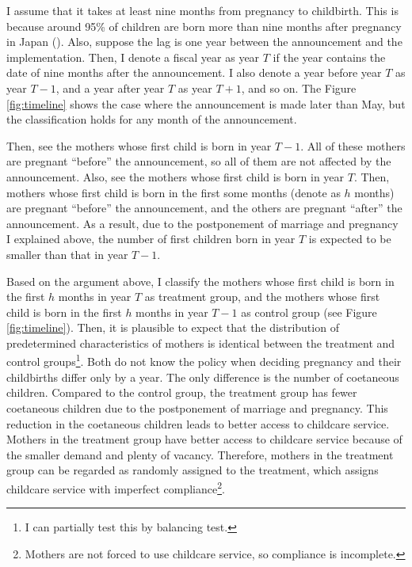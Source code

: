 \documentclass[12pt]{article}
\begin{document}
I assume that it takes at least nine months from pregnancy to childbirth.
This is because around 95\% of children are born more than nine months after pregnancy in Japan (\cite{sakata2018}).
Also, suppose the lag is one year between the announcement and the implementation.
Then, I denote a fiscal year as year $T$ if the year contains the date of nine months after the announcement.
I also denote a year before year $T$ as year $T-1$, and a year after year $T$ as year $T+1$, and so on.
The Figure \ref{fig:timeline} shows the case where the announcement is made later than May, but the classification holds for any month of the announcement.


Then, see the mothers whose first child is born in year $T-1$. 
All of these mothers are pregnant ``before'' the announcement, so all of them are not affected by the announcement.
Also, see the mothers whose first child is born in year $T$. 
Then, mothers whose first child is born in the first some months (denote as $h$ months) are pregnant ``before'' the announcement, and the others are pregnant ``after'' the announcement.
As a result, due to the postponement of marriage and pregnancy I explained above, the number of first children born in year $T$ is expected to be smaller than that in year $T-1$.


Based on the argument above, I classify the mothers whose first child is born in the first $h$ months in year $T$ as treatment group, and the mothers whose first child is born in the first $h$ months in year $T-1$ as control group (see Figure \ref{fig:timeline}).
Then, it is plausible to expect that the distribution of predetermined characteristics of mothers is identical between the treatment and control groups\footnote{I can partially test this by balancing test.}.
Both do not know the policy when deciding pregnancy and their childbirths differ only by a year.
The only difference is the number of coetaneous children. 
Compared to the control group, the treatment group has fewer coetaneous children due to the postponement of marriage and pregnancy.
This reduction in the coetaneous children leads to better access to childcare service. 
Mothers in the treatment group have better access to childcare service because of the smaller demand and plenty of vacancy. 
Therefore, mothers in the treatment group can be regarded as randomly assigned to the treatment, which assigns childcare service with imperfect compliance\footnote{Mothers are not forced to use childcare service, so compliance is incomplete.}.
\end{document}
